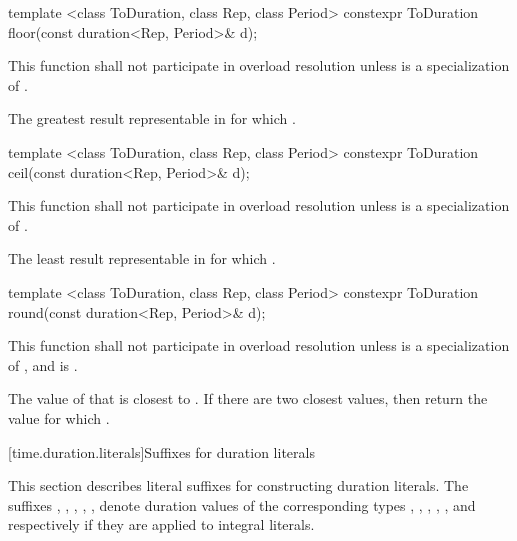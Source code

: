 %
\begin{itemdecl}
template <class ToDuration, class Rep, class Period>
  constexpr ToDuration floor(const duration<Rep, Period>& d);
\end{itemdecl}

\begin{itemdescr}
\pnum
\remarks This function shall not participate in overload resolution
unless  is a specialization of .

\pnum
\returns The greatest result  representable in 
for which .
\end{itemdescr}

%
\begin{itemdecl}
template <class ToDuration, class Rep, class Period>
  constexpr ToDuration ceil(const duration<Rep, Period>& d);
\end{itemdecl}

\begin{itemdescr}
\pnum
\remarks This function shall not participate in overload resolution
unless  is a specialization of .

\pnum
\returns The least result  representable in 
for which .
\end{itemdescr}

%
\begin{itemdecl}
template <class ToDuration, class Rep, class Period>
  constexpr ToDuration round(const duration<Rep, Period>& d);
\end{itemdecl}

\begin{itemdescr}
\pnum
\remarks This function shall not participate in overload resolution
unless  is a specialization of ,
and 
is .

\pnum
\returns The value of  that is closest to .
If there are two closest values, then return the value 
for which .
\end{itemdescr}

[time.duration.literals]{Suffixes for duration literals}

\pnum
This section describes literal suffixes for constructing duration literals. The
suffixes , , , , , 
denote duration values of the corresponding types , ,
, , , and 
respectively if they are applied to integral literals.

